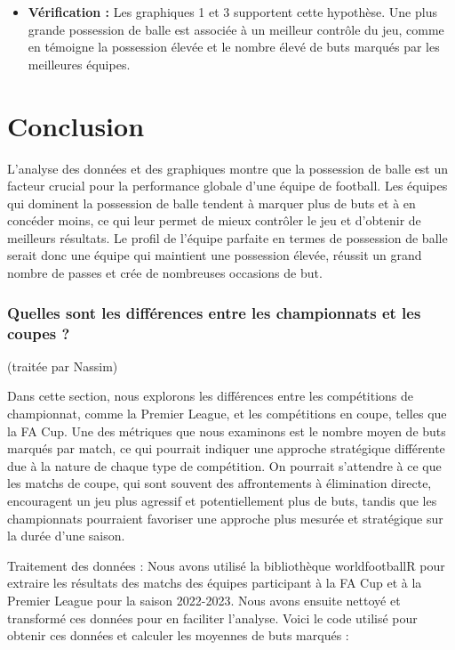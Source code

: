 \documentclass[
]{article}
\providecommand{\tightlist}{%
  \setlength{\itemsep}{0pt}\setlength{\parskip}{0pt}}
\begin{document}
\begin{itemize}
\tightlist
\item
  \textbf{Vérification :} Les graphiques 1 et 3 supportent cette
  hypothèse. Une plus grande possession de balle est associée à un
  meilleur contrôle du jeu, comme en témoigne la possession élevée et le
  nombre élevé de buts marqués par les meilleures équipes.
\end{itemize}

\section{Conclusion}\label{conclusion}

L'analyse des données et des graphiques montre que la possession de
balle est un facteur crucial pour la performance globale d'une équipe de
football. Les équipes qui dominent la possession de balle tendent à
marquer plus de buts et à en concéder moins, ce qui leur permet de mieux
contrôler le jeu et d'obtenir de meilleurs résultats. Le profil de
l'équipe parfaite en termes de possession de balle serait donc une
équipe qui maintient une possession élevée, réussit un grand nombre de
passes et crée de nombreuses occasions de but.

\subsubsection{\texorpdfstring{\textbf{Quelles sont les différences
entre les championnats et les coupes
?}}{Quelles sont les différences entre les championnats et les coupes ?}}\label{quelles-sont-les-diffuxe9rences-entre-les-championnats-et-les-coupes}

(traitée par Nassim)

Dans cette section, nous explorons les différences entre les
compétitions de championnat, comme la Premier League, et les
compétitions en coupe, telles que la FA Cup. Une des métriques que nous
examinons est le nombre moyen de buts marqués par match, ce qui pourrait
indiquer une approche stratégique différente due à la nature de chaque
type de compétition. On pourrait s'attendre à ce que les matchs de
coupe, qui sont souvent des affrontements à élimination directe,
encouragent un jeu plus agressif et potentiellement plus de buts, tandis
que les championnats pourraient favoriser une approche plus mesurée et
stratégique sur la durée d'une saison.

Traitement des données : Nous avons utilisé la bibliothèque
worldfootballR pour extraire les résultats des matchs des équipes
participant à la FA Cup et à la Premier League pour la saison 2022-2023.
Nous avons ensuite nettoyé et transformé ces données pour en faciliter
l'analyse. Voici le code utilisé pour obtenir ces données et calculer
les moyennes de buts marqués :
\end{document}
